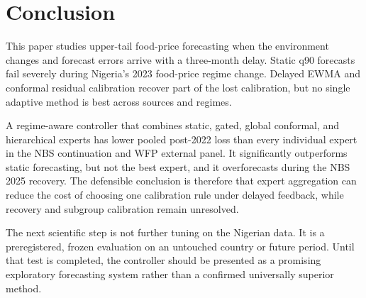 \section{Conclusion}\label{conclusion}

This paper studies upper-tail food-price forecasting when the
environment changes and forecast errors arrive with a three-month delay.
Static q90 forecasts fail severely during Nigeria's 2023 food-price
regime change. Delayed EWMA and conformal residual calibration recover
part of the lost calibration, but no single adaptive method is best
across sources and regimes.

A regime-aware controller that combines static, gated, global conformal,
and hierarchical experts has lower pooled post-2022 loss than every
individual expert in the NBS continuation and WFP external panel. It
significantly outperforms static forecasting, but not the best expert,
and it overforecasts during the NBS 2025 recovery. The defensible
conclusion is therefore that expert aggregation can reduce the cost of
choosing one calibration rule under delayed feedback, while recovery and
subgroup calibration remain unresolved.

The next scientific step is not further tuning on the Nigerian data. It
is a preregistered, frozen evaluation on an untouched country or future
period. Until that test is completed, the controller should be presented
as a promising exploratory forecasting system rather than a confirmed
universally superior method.
